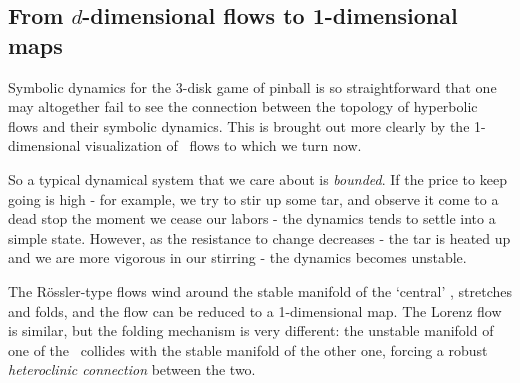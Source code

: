 \subsection{From $d$-dimensional flows to
           1-dimensional maps}\label{sec:retMaps}

Symbolic dynamics for the $3$-disk game of pinball is so
straight\-forward that one may altogether fail to see the
connection between the topology of hyperbolic flows and their
symbolic dynamics. This is brought out more
clearly by the 1-dimensional visualization of \stretchf\ flows
to which we turn now.

So a typical dynamical system
that we care about is {\em bounded}. If the price to keep going
is high - for example, we try to stir up some tar, and observe
it come to a dead stop the moment we cease our labors - the
dynamics tends to settle into a simple state. However,
as the resistance to change decreases - the tar is heated up
and we are more vigorous in our stirring - the dynamics becomes
unstable.



The R\"ossler-type flows wind around the stable manifold of the
`central' \eqv, stretches and folds, and  the
flow can be reduced to a 1-dimensional map. The Lorenz flow is
similar, but the folding mechanism is very different: the unstable
manifold of one of the \eqva\ collides with the stable manifold
of the other one, forcing a robust {\em heteroclinic
connection} between the two.

